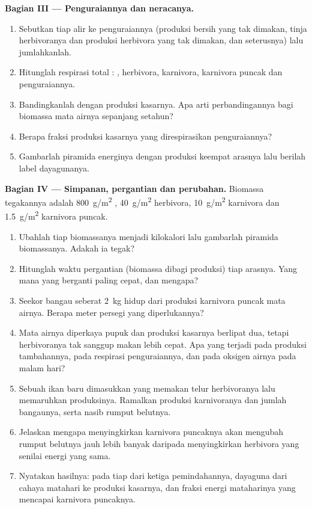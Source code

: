 \begin{problem}
\medskip
\noindent\textbf{Bagian III --- Penguraiannya dan neracanya.}
\begin{enumerate}[resume]
  \item Sebutkan tiap alir ke penguraiannya (produksi bersih yang tak
        dimakan, tinja herbivoranya dan produksi herbivora yang tak
        dimakan, dan seterusnya) lalu jumlahkanlah.
  \item Hitunglah respirasi total : , herbivora,
        karnivora, karnivora puncak dan penguraiannya.
  \item Bandingkanlah dengan produksi kasarnya. Apa arti perbandingannya
        bagi biomassa mata airnya sepanjang setahun?
  \item Berapa fraksi produksi kasarnya yang direspirasikan
        penguraiannya?
  \item Gambarlah piramida energinya dengan produksi keempat arasnya
        lalu berilah label dayagunanya.
\end{enumerate}

\medskip
\noindent\textbf{Bagian IV --- Simpanan, pergantian dan perubahan.}
Biomassa tegakannya adalah \qty{800}{g/m^2} , \qty{40}{g/m^2}
herbivora, \qty{10}{g/m^2} karnivora dan \qty{1.5}{g/m^2} karnivora
puncak.
\begin{enumerate}[resume]
  \item Ubahlah tiap biomassanya menjadi kilokalori lalu gambarlah
        piramida biomassanya. Adakah ia tegak?
  \item Hitunglah waktu pergantian (biomassa dibagi produksi) tiap
        arasnya. Yang mana yang berganti paling cepat, dan mengapa?
  \item Seekor bangau seberat \qty{2}{kg} hidup dari produksi karnivora
        puncak mata airnya. Berapa meter persegi yang diperlukannya?
  \item Mata airnya diperkaya pupuk dan produksi kasarnya berlipat dua,
        tetapi herbivoranya tak sanggup makan lebih cepat. Apa yang
        terjadi pada produksi tambahannya, pada respirasi
        penguraiannya, dan pada oksigen airnya pada malam hari?
  \item Sebuah ikan baru dimasukkan yang memakan telur herbivoranya
        lalu memaruhkan produksinya. Ramalkan produksi karnivoranya dan
        jumlah bangaunya, serta nasib rumput belutnya.
  \item Jelaskan mengapa menyingkirkan karnivora puncaknya akan
        mengubah rumput belutnya jauh lebih banyak daripada
        menyingkirkan herbivora yang senilai energi yang sama.
  \item Nyatakan hasilnya:  pada tiap dari ketiga
        pemindahannya, dayaguna dari cahaya matahari ke produksi
        kasarnya, dan fraksi energi mataharinya yang mencapai karnivora
        puncaknya.
\end{enumerate}
\end{problem}
